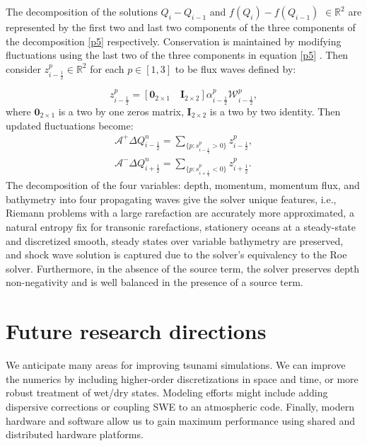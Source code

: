 \documentclass[10pt,a4paper]{article}
\newcommand{\donna}[1]{{\color{red}{#1}}}
\begin{document}
	The decomposition of the solutions $Q_{i} - Q_{i-1} $  and  $f(Q_{i}) - f(Q_{i-1})$ $ \in  \mathbb{R}^{2}$ are represented by the first two and last two components of the three components of the decomposition \eqref{p5} respectively.  Conservation is maintained by modifying fluctuations using the last two of the three components  in equation \eqref{p5} . Then  consider $z_{i-\frac{1}{2}}^{p} \in \mathbb{R}^{2}$ for each $p \in [1,3]$ to be flux waves defined by:
	
	
	\begin{equation}
		z_{i-\frac{1}{2}}^{p} = [\mathbf{0}_{2\times1} \quad \mathbf{I}_{2\times2}] \alpha_{i-\frac{1}{2}}^{p} \mathcal{W}_{i-\frac{1}{2}}^{p},
	\end{equation}
	where $\mathbf{0}_{2\times1}$ is a two by one zeros matrix, $\mathbf{I}_{2\times2}$ is a two by two identity. Then updated fluctuations become:
	\begin{eqnarray}
		\mathcal{A^{+}}\Delta Q_{i-\frac{1}{2}}^{n} = \sum_{\{ p:s_{i-\frac{1}{2}}^{p}>0\}}  z_{i-\frac{1}{2}}^{p},
		\label{p7}\\
		\mathcal{A^{-}}\Delta Q_{i+\frac{1}{2}}^{n} = \sum_{\{ p:s_{i+\frac{1}{2}}^{p}<0\}} z_{i+\frac{1}{2}}^{p}.
		\label{p8}
	\end{eqnarray}
	The decomposition of the four variables: depth, momentum, momentum flux, and bathymetry into four propagating waves give the solver unique features, i.e.,  Riemann problems with a large rarefaction are accurately more approximated, a natural entropy fix for transonic rarefactions,  stationery oceans at a steady-state and discretized smooth, steady states over variable bathymetry are preserved, and shock wave solution is captured due to the solver's equivalency to the Roe solver.
	Furthermore, in the absence of the source term, the solver preserves depth non-negativity and is well balanced in the presence of a source term.  
	
	
	\section{ Future research directions}
	
	We anticipate many areas for improving tsunami simulations.  We can improve the numerics by including higher-order discretizations in space and time, or more robust treatment of  wet/dry states. Modeling efforts might include adding dispersive corrections or coupling  SWE to an atmospheric code.   Finally, modern hardware and software allow us to gain maximum performance using shared and distributed hardware  platforms. 
	
\end{document}
